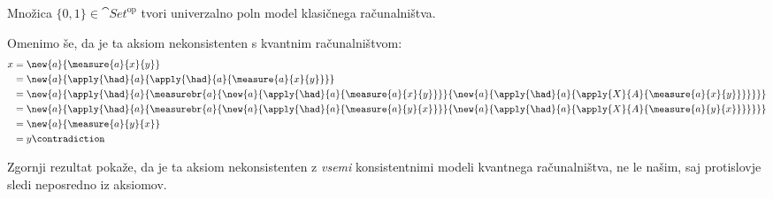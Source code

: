 \begin{proposition}
    Množica \(\{0,1\} ∈ \cat{Set}^{\textrm{op}}\) tvori univerzalno poln model klasičnega računalništva.
\end{proposition}

Omenimo še, da je ta aksiom nekonsistenten s kvantnim računalništvom:
\begin{align*}
    x &= \new{a}{\measure{a}{x}{y}}\\
      &= \new{a}{\apply{\had}{a}{\apply{\had}{a}{\measure{a}{x}{y}}}}\\
      &= \new{a}{\apply{\had}{a}{\measurebr{a}{
            \new{a}{\apply{\had}{a}{             \measure{a}{x}{y}}}}{
            \new{a}{\apply{\had}{a}{\apply{X}{A}{\measure{a}{x}{y}}}}
        }}}\\
      &= \new{a}{\apply{\had}{a}{\measurebr{a}{
            \new{a}{\apply{\had}{a}{             \measure{a}{y}{x}}}}{
            \new{a}{\apply{\had}{a}{\apply{X}{A}{\measure{a}{y}{x}}}}
        }}}\\
      &= \new{a}{\measure{a}{y}{x}}\\
      &= y \contradiction
\end{align*}
\begin{remark}
    Zgornji rezultat pokaže, da je ta aksiom nekonsistenten z \emph{vsemi} konsistentnimi modeli kvantnega računalništva, ne le našim, saj protislovje sledi neposredno iz aksiomov.
\end{remark}
